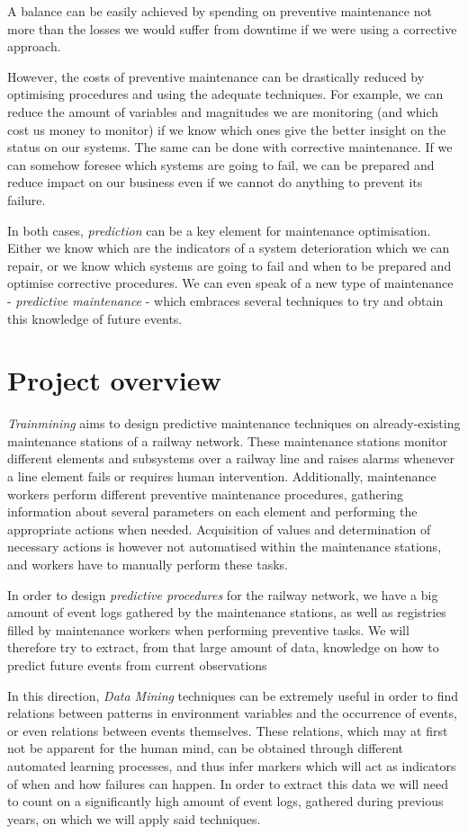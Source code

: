 \documentclass[a4paper,10pt]{report}
\begin{document}
A balance can be easily achieved by spending on preventive maintenance not more than the losses we would suffer from downtime if we were using a corrective approach.

However, the costs of preventive maintenance can be drastically reduced by optimising procedures and using the adequate techniques. For example, we can reduce the amount of variables and magnitudes we are monitoring (and which cost us money to monitor) if we know which ones give the better insight on the status on our systems. The same can be done with corrective maintenance. If we can somehow foresee which systems are going to fail, we can be prepared and reduce impact on our business even if we cannot do anything to prevent its failure.

In both cases, \emph{prediction} can be a key element for maintenance optimisation. Either we know which are the indicators of a system deterioration which we can repair, or we know which systems are going to fail and when to be prepared and optimise corrective procedures. We can even speak of a new type of maintenance - \emph{predictive maintenance} - which embraces several techniques to try and obtain this knowledge of future events.

\section{Project overview}
\emph{Trainmining} aims to design predictive maintenance techniques on already-existing maintenance stations of a railway network. These maintenance stations monitor different elements and subsystems over a railway line and raises alarms whenever a line element fails or requires human intervention. Additionally, maintenance workers perform different preventive maintenance procedures, gathering information about several parameters on each element and performing the appropriate actions when needed. Acquisition of values and determination of necessary actions is however not automatised within the maintenance stations, and workers have to manually perform these tasks.

In order to design \emph{predictive procedures} for the railway network, we have a big amount of event logs gathered by the maintenance stations, as well as registries filled by maintenance workers when performing preventive tasks. We will therefore try to extract, from that large amount of data, knowledge on how to predict future events from current observations

In this direction, \emph{Data Mining} techniques can be extremely useful in order to find relations between patterns in environment variables and the occurrence of events, or even relations between events themselves. These relations, which may at first not be apparent for the human mind, can be obtained through different automated learning processes, and thus infer markers which will act as indicators of when and how failures can happen. In order to extract this data we will need to count on a significantly high amount of event logs, gathered during previous years, on which we will apply said techniques.
\end{document}
